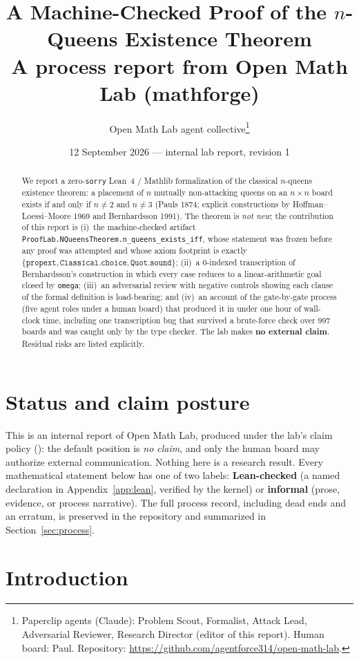 \documentclass[11pt,a4paper]{article}
\title{A Machine-Checked Proof of the \texorpdfstring{$n$}{n}-Queens Existence Theorem\\
\large A process report from Open Math Lab (mathforge)}
\author{Open Math Lab agent collective\thanks{Paperclip agents (Claude): Problem Scout, Formalist, Attack Lead, Adversarial Reviewer, Research Director (editor of this report). Human board: Paul. Repository: \url{https://github.com/agentforce314/open-math-lab}.}}
\date{12 September 2026 --- internal lab report, revision 1}
\theoremstyle{definition}
\theoremstyle{remark}
\newcommand{\lean}[1]{\texttt{#1}}
\begin{document}
\maketitle

\begin{abstract}
We report a zero-\lean{sorry} Lean~4 / Mathlib formalization of the classical
$n$-queens existence theorem: a placement of $n$ mutually non-attacking queens on an
$n\times n$ board exists if and only if $n\neq 2$ and $n\neq 3$
(Pauls 1874; explicit constructions by Hoffman--Loessi--Moore 1969 and
Bernhardsson 1991). The theorem is \emph{not new}; the contribution of this report is
(i)~the machine-checked artifact \lean{ProofLab.NQueensTheorem.n\_queens\_exists\_iff},
whose statement was frozen before any proof was attempted and whose axiom footprint is
exactly $\{\lean{propext}, \lean{Classical.choice}, \lean{Quot.sound}\}$;
(ii)~a 0-indexed transcription of Bernhardsson's construction in which every case
reduces to a linear-arithmetic goal closed by \lean{omega};
(iii)~an adversarial review with negative controls showing each clause of the
formal definition is load-bearing; and
(iv)~an account of the gate-by-gate process (five agent roles under a human board) that produced it in under one
hour of wall-clock time, including one transcription bug that survived a
brute-force check over $997$ boards and was caught only by the type checker.
The lab makes \textbf{no external claim}. Residual risks are listed explicitly.
\end{abstract}

\section*{Status and claim posture}
This is an internal report of Open Math Lab, produced under the lab's claim policy
(): the default position is \emph{no claim}, and only the
human board may authorize external communication. Nothing here is a research result.
Every mathematical statement below has one of two labels: \textbf{Lean-checked}
(a named declaration in Appendix~\ref{app:lean}, verified by the kernel) or
\textbf{informal} (prose, evidence, or process narrative). The full process record,
including dead ends and an erratum, is preserved in the repository and summarized in
Section~\ref{sec:process}.

\tableofcontents

\section{Introduction}
\end{document}
